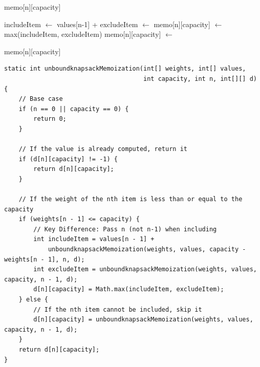 \documentclass{article}
\begin{document}
\begin{tcolorbox}[title=Algorithm: Memoization Approach]
\begin{algorithm}[H]
\begin{algorithmic}[1]
    \EndIf
    
        \Return memo[n][capacity]
    \EndIf
    
        \State includeItem $\gets$ values[n-1] + 
        \State excludeItem $\gets$ 
        \State memo[n][capacity] $\gets$ max(includeItem, excludeItem)
    \Else
        \State memo[n][capacity] $\gets$ 
    \EndIf
    
    \Return memo[n][capacity]
\EndFunction
\end{algorithmic}
\end{algorithm}
\end{tcolorbox}

\begin{lstlisting}[caption=Memoization Implementation]
static int unboundknapsackMemoization(int[] weights, int[] values, 
                                      int capacity, int n, int[][] d) {
    // Base case
    if (n == 0 || capacity == 0) {
        return 0;
    }
    
    // If the value is already computed, return it
    if (d[n][capacity] != -1) {
        return d[n][capacity];
    }
    
    // If the weight of the nth item is less than or equal to the capacity
    if (weights[n - 1] <= capacity) {
        // Key Difference: Pass n (not n-1) when including
        int includeItem = values[n - 1] + 
            unboundknapsackMemoization(weights, values, capacity - weights[n - 1], n, d);
        int excludeItem = unboundknapsackMemoization(weights, values, capacity, n - 1, d);
        d[n][capacity] = Math.max(includeItem, excludeItem);
    } else {
        // If the nth item cannot be included, skip it
        d[n][capacity] = unboundknapsackMemoization(weights, values, capacity, n - 1, d);
    }
    return d[n][capacity]; 
}
\end{lstlisting}
\end{document}
